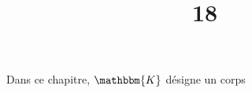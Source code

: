 \documentclass[a4paper]{report}
\title{18}{Polynômes formels}
\begin{document}
	\tableofcontents
	\vfill
	Dans ce chapitre, $\mathbbm{K}$ désigne un corps
	\vfill

	
	
	
	
\end{document}

